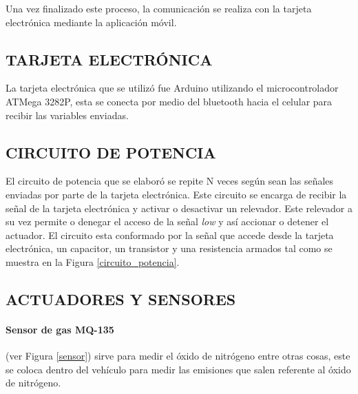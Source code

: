 Una vez finalizado este proceso, la comunicación se realiza con la tarjeta electrónica mediante la aplicación móvil.

\subsection{TARJETA ELECTRÓNICA}

La tarjeta electrónica que se utilizó fue Arduino utilizando el microcontrolador ATMega 3282P, esta se conecta por medio del bluetooth hacia el celular para recibir las variables enviadas.\\



\subsection{CIRCUITO DE POTENCIA}

El circuito de potencia que se elaboró se repite N veces según sean las señales enviadas por parte de la tarjeta electrónica. Este circuito se encarga de recibir la señal de la tarjeta electrónica y activar o desactivar un relevador. Este relevador a su vez permite o denegar el acceso de la señal \textit{low} y así accionar o detener el actuador. El circuito esta conformado por la señal que accede desde la tarjeta electrónica, un capacitor, un transistor y una resistencia armados tal como se muestra en la Figura \ref{circuito_potencia}.  \\

%

\subsection{ACTUADORES Y SENSORES}

   
\paragraph{Sensor de gas MQ-135}
 (ver Figura \ref{sensor}) sirve para medir el óxido de nitrógeno entre otras cosas, este se coloca dentro del vehículo para medir las emisiones que salen referente al óxido de nitrógeno.\\

